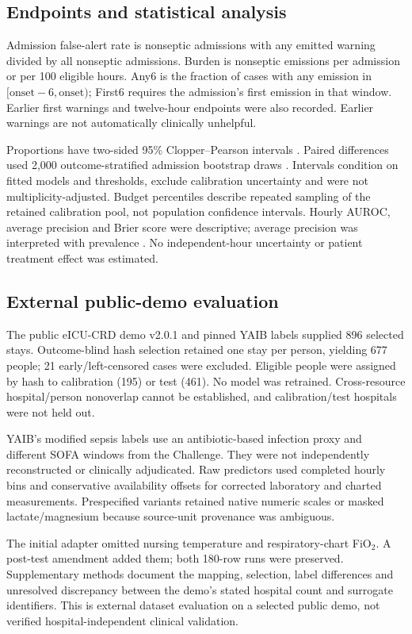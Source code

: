 \documentclass[preprint,12pt]{elsarticle}
\newcommand{\anysix}{Any6}
\newcommand{\firstsix}{First6}
\begin{document}
\subsection{Endpoints and statistical analysis}
Admission false-alert rate is nonseptic admissions with any emitted warning divided by all nonseptic admissions. Burden is nonseptic emissions per admission or per 100 eligible hours. \anysix{} is the fraction of cases with any emission in $[\mathrm{onset}-6,\mathrm{onset})$; \firstsix{} requires the admission's first emission in that window. Earlier first warnings and twelve-hour endpoints were also recorded. Earlier warnings are not automatically clinically unhelpful.

Proportions have two-sided 95\% Clopper--Pearson intervals \cite{clopper}. Paired differences used 2,000 outcome-stratified admission bootstrap draws \cite{efron}. Intervals condition on fitted models and thresholds, exclude calibration uncertainty and were not multiplicity-adjusted. Budget percentiles describe repeated sampling of the retained calibration pool, not population confidence intervals. Hourly AUROC, average precision and Brier score were descriptive; average precision was interpreted with prevalence \cite{saito}. No independent-hour uncertainty or patient treatment effect was estimated.

\subsection{External public-demo evaluation}
The public eICU-CRD demo v2.0.1 \cite{eicudemo,eicu} and pinned YAIB labels \cite{yaib} supplied 896 selected stays. Outcome-blind hash selection retained one stay per person, yielding 677 people; 21 early/left-censored cases were excluded. Eligible people were assigned by hash to calibration (195) or test (461). No model was retrained. Cross-resource hospital/person nonoverlap cannot be established, and calibration/test hospitals were not held out.

YAIB's modified sepsis labels use an antibiotic-based infection proxy and different SOFA windows from the Challenge. They were not independently reconstructed or clinically adjudicated. Raw predictors used completed hourly bins and conservative availability offsets for corrected laboratory and charted measurements. Prespecified variants retained native numeric scales or masked lactate/magnesium because source-unit provenance was ambiguous.

The initial adapter omitted nursing temperature and respiratory-chart FiO$_2$. A post-test amendment added them; both 180-row runs were preserved. Supplementary methods document the mapping, selection, label differences and unresolved discrepancy between the demo's stated hospital count and surrogate identifiers. This is external dataset evaluation on a selected public demo, not verified hospital-independent clinical validation.
\end{document}
